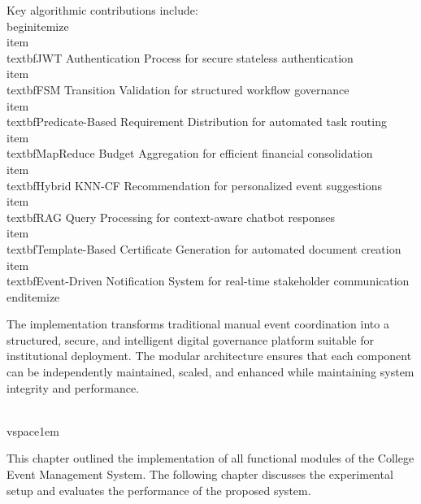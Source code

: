 Key algorithmic contributions include:
\\begin{itemize}
\\item \\textbf{JWT Authentication Process} for secure stateless authentication
\\item \\textbf{FSM Transition Validation} for structured workflow governance
\\item \\textbf{Predicate-Based Requirement Distribution} for automated task routing
\\item \\textbf{MapReduce Budget Aggregation} for efficient financial consolidation
\\item \\textbf{Hybrid KNN-CF Recommendation} for personalized event suggestions
\\item \\textbf{RAG Query Processing} for context-aware chatbot responses
\\item \\textbf{Template-Based Certificate Generation} for automated document creation
\\item \\textbf{Event-Driven Notification System} for real-time stakeholder communication
\\end{itemize}

The implementation transforms traditional manual event coordination into a structured, secure, and intelligent digital governance platform suitable for institutional deployment. The modular architecture ensures that each component can be independently maintained, scaled, and enhanced while maintaining system integrity and performance.

\\vspace{1em}

This chapter outlined the implementation of all functional modules of the College Event Management System. The following chapter discusses the experimental setup and evaluates the performance of the proposed system.